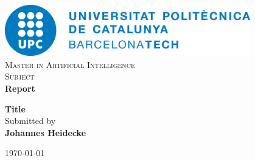 \begin{titlepage}

\begin{center}


\includegraphics[width=0.8\textwidth]{img/title/upc}\\[0.1in]
\normalsize
\vspace{1cm}
\textsc{Master in Artificial Intelligence}\\

\vspace{4cm}
\textsc{Subject} \\
\normalsize \textbf{Report}
\vspace{2cm}

\Large \textbf {Title} \\

\vspace{2.5cm}
\normalsize Submitted by \\
\textbf{Johannes Heidecke} \\ %



\vfill


{\normalsize \today}\\[1cm]
\end{center}

\end{titlepage}